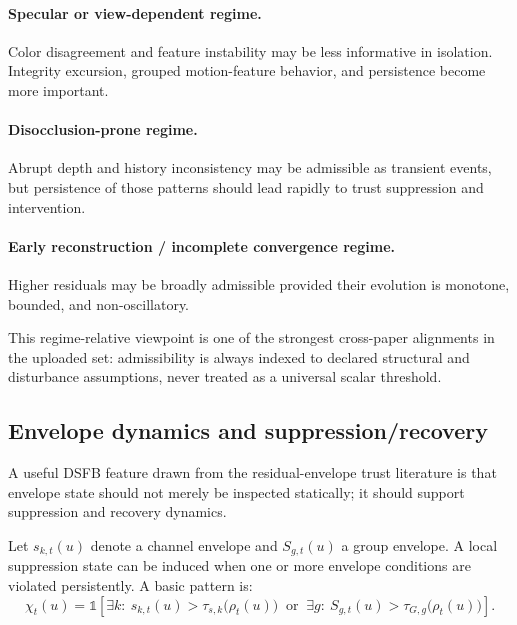 \documentclass[11pt]{article}
\theoremstyle{definition}
\theoremstyle{plain}
\begin{document}
\paragraph{Specular or view-dependent regime.}
Color disagreement and feature instability may be less informative in isolation. Integrity excursion, grouped motion-feature behavior, and persistence become more important.

\paragraph{Disocclusion-prone regime.}
Abrupt depth and history inconsistency may be admissible as transient events, but persistence of those patterns should lead rapidly to trust suppression and intervention.

\paragraph{Early reconstruction / incomplete convergence regime.}
Higher residuals may be broadly admissible provided their evolution is monotone, bounded, and non-oscillatory.

This regime-relative viewpoint is one of the strongest cross-paper alignments in the uploaded set: admissibility is always indexed to declared structural and disturbance assumptions, never treated as a universal scalar threshold. 


\subsection{Envelope dynamics and suppression/recovery}

A useful DSFB feature drawn from the residual-envelope trust literature is that envelope state should not merely be inspected statically; it should support suppression and recovery dynamics.

Let $s_{k,t}(u)$ denote a channel envelope and $S_{g,t}(u)$ a group envelope. A local suppression state can be induced when one or more envelope conditions are violated persistently. A basic pattern is:
\begin{equation}
\chi_t(u)=
\mathbb{1}\!\left[
\exists k:\ s_{k,t}(u)>\tau_{s,k}\bigl(\rho_t(u)\bigr)
\;\;\text{or}\;\;
\exists g:\ S_{g,t}(u)>\tau_{G,g}\bigl(\rho_t(u)\bigr)
\right].
\end{equation}
\end{document}

